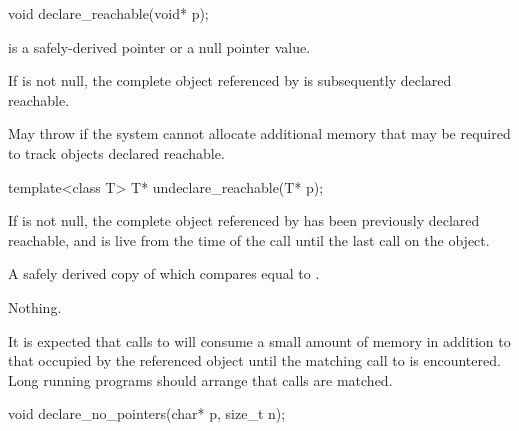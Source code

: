 %
\begin{itemdecl}
void declare_reachable(void* p);
\end{itemdecl}

\begin{itemdescr}
\pnum
\expects
{} is a safely-derived pointer
or a null pointer value.

\pnum
\effects
If  is not null, the complete object referenced by 
is subsequently declared reachable.

\pnum
\throws
May throw  if the system cannot allocate
additional memory that may be required to track objects declared reachable.
\end{itemdescr}

%
\begin{itemdecl}
template<class T> T* undeclare_reachable(T* p);
\end{itemdecl}

\begin{itemdescr}
\pnum
\expects
If  is not null, the complete object referenced by 
has been previously declared reachable, and is
live from the time of the call until the last
 call on the object.

\pnum
\returns
A safely derived copy of  which compares equal to .

\pnum
\throws
Nothing.

\pnum
\begin{note}
It is expected that calls to  will consume
a small amount of memory in addition to that occupied by the referenced object until the
matching call to  is encountered. Long running programs
should arrange that calls are matched.
\end{note}
\end{itemdescr}

%
\begin{itemdecl}
void declare_no_pointers(char* p, size_t n);
\end{itemdecl}

